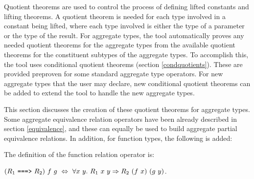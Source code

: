 \documentclass[envcountsame,runningheads]{llncs}
\newcommand{\quotient}{partial equivalence}
\begin{document}

Quotient theorems are used to control 
the process of defining lifted constants and lifting theorems.
A quotient theorem is needed for each type involved in a constant
being lifted, where each type involved is either the type of a parameter
or the type of the result.
For aggregate types,
the tool automatically proves any needed quotient theorems for the
aggregate types from the available quotient theorems for the 
constituent subtypes of the aggregate types. 
To accomplish this, the tool uses conditional quotient theorems
(section \ref{condquotients}). 
These are provided preproven for some standard aggregate type operators.
For new aggregate types that the user may declare,
new conditional quotient theorems can be added to extend the tool
to handle the new aggregate types.

This section discusses the creation
of these quotient
theorems for aggregate types.  Some aggregate equivalence relation
operators have been already described in section \ref{equivalence}, and
these can equally be used to build aggregate \quotient{} relations. 
In addition, for function types, the following is added:

\begin{center}
\end{center}

\noindent
The definition of the function relation operator is:
\begin{definition}
\label{funrel}
$(R_1\ \mbox {\tt ===>} \ R_2)\ f \ g \ \Leftrightarrow \ 
\forall x \ y. \ R_1\ x\ y \Rightarrow R_2\ (f\ x)\ (g\ y)$.
\end{definition}
\end{document}

